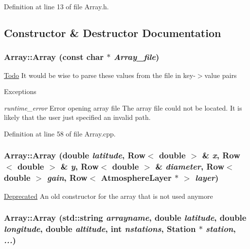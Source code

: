 Definition at line 13 of file Array.h.



\subsection{Constructor \& Destructor Documentation}
\hypertarget{classArray_ab28022bcc92a1ae0f5676f0dcd22eb1b}{
\subsubsection[{Array}]{\setlength{\rightskip}{0pt plus 5cm}Array::Array (const char $\ast$ {\em Array\_\-file})}}
\label{classArray_ab28022bcc92a1ae0f5676f0dcd22eb1b}


\begin{Desc}
\item[\hyperlink{todo__todo000001}{Todo}]It would be wise to parse these values from the file in key-\/$>$value pairs \end{Desc}



\begin{DoxyExceptions}{Exceptions}
\item[{\em runtime\_\-error}]Error opening array file The array file could not be located. It is likely that the user just specified an invalid path. \end{DoxyExceptions}




Definition at line 58 of file Array.cpp.

\hypertarget{classArray_af9101fdd8b76720362cc5aa867580c24}{
\subsubsection[{Array}]{\setlength{\rightskip}{0pt plus 5cm}Array::Array (double {\em latitude}, \/  {\bf Row}$<$ double $>$ \& {\em x}, \/  {\bf Row}$<$ double $>$ \& {\em y}, \/  {\bf Row}$<$ double $>$ \& {\em diameter}, \/  {\bf Row}$<$ double $>$ {\em gain}, \/  {\bf Row}$<$ {\bf AtmosphereLayer} $\ast$ $>$ {\em layer})}}
\label{classArray_af9101fdd8b76720362cc5aa867580c24}
\begin{Desc}
\item[\hyperlink{deprecated__deprecated000001}{Deprecated}]An old constructor for the array that is not used anymore \end{Desc}
\hypertarget{classArray_a63701bee30e516b38e6acb3449f6ce7f}{
\subsubsection[{Array}]{\setlength{\rightskip}{0pt plus 5cm}Array::Array (std::string {\em arrayname}, \/  double {\em latitude}, \/  double {\em longitude}, \/  double {\em altitude}, \/  int {\em nstations}, \/  {\bf Station} $\ast$ {\em station}, \/   {\em ...})}}
\label{classArray_a63701bee30e516b38e6acb3449f6ce7f}


